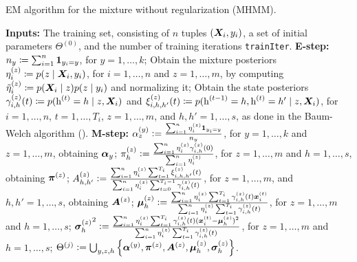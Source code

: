\begin{algorithm}
	\caption{EM algorithm for the mixture without regularization (MHMM).}
	\label{alg:mhmm}
	\begin{algorithmic}[1]
		\State \textbf{Inputs:} The training set, consisting of $n$ tuples $({\bm{X}}_i,y_i)$, a set of initial parameters $\Theta^{(0)}$, and the number of training iterations \texttt{trainIter}.
		\vspace{0.3cm}
		\vspace{0.3cm}
		\State \textbf{E-step:}
		\vspace{0.3cm}
		\Indent
			\State $n_y \coloneqq \sum_{i=1}^n \bm{1}_{y_i=y}$, for $y=1,\dots,k$;
			\vspace{0.3cm}
			\State Obtain the mixture posteriors $\eta^{(z)}_{i} \coloneqq p(z \mid {\bm{X}}_i, y_i)$, for $i=1,\dots,n$ and $z=1,\dots,m$, by computing  $\tilde{\eta}^{(z)}_{i} \coloneqq p({\bm{X}}_i \mid z)p(z \mid y_i)$ and normalizing it;
			\vspace{0.3cm}
			\State Obtain the state posteriors $\gamma^{(z)}_{i,h}(t) \coloneqq p({\textnormal{h}}^{(t)}=h \mid z, {\bm{X}}_i)$ and $\xi^{(z)}_{i,h,h'}(t) \coloneqq p({\textnormal{h}}^{(t-1)}=h, {\textnormal{h}}^{(t)}=h' \mid z, {\bm{X}}_i)$, for $i=1,\dots,n$, $t=1,\dots,T_i$, $z=1,\dots,m$, and $h,h'=1,\dots,s$, as done in the Baum-Welch algorithm (\citet{Baum1972}).
			\vspace{0.3cm}
		\EndIndent
		\State \textbf{M-step:}
		\vspace{0.3cm}
		\Indent
			\State ${\alpha}^{(y)}_{z} := \frac{\sum_{i=1}^n \eta^{(z)}_{i} \bm{1}_{y_i=y}}{n_y}$, for $y=1,\dots,k$ and $z=1,\dots,m$, obtaining ${\bm{\alpha}}_y$;
			\vspace{0.3cm}
			\State ${\pi}^{(z)}_h := \frac{\sum_{i=1}^n \eta^{(z)}_{i} \gamma^{(z)}_{i,h}(0)}{\sum_{i=1}^n \eta^{(z)}_{i}}$, for $z=1,\dots,m$ and $h=1,\dots,s$, obtaining ${\bm{\pi}}^{(z)}$;
			\vspace{0.3cm} 
			\State ${A}^{(z)}_{h,h'} := \frac{\sum_{i=1}^n \eta^{(z)}_{i} \sum_{t=1}^{T_i} \xi^{(z)}_{i,h,h'}(t)}{\sum_{i=1}^n \eta^{(z)}_{i} \sum_{t=0}^{T_i-1} \gamma^{(z)}_{i,h}(t)}$, for $z=1,\dots,m$, and $h,h'=1,\dots,s$, obtaining ${\bm{A}}^{(z)}$;
			\vspace{0.3cm}
			\State ${\bm{\mu}}^{(z)}_h := \frac{\sum_{i=1}^n \eta^{(z)}_{i} \sum_{t=1}^{T_i} \gamma^{(z)}_{i,h}(t) {\bm{x}}_i^{(t)}} {\sum_{i=1}^n \eta^{(z)}_{i} \sum_{t=1}^{T_i} \gamma^{(z)}_{i,h}(t)}$, for $z=1,\dots,m$ and $h=1,\dots,s$;
			\vspace{0.3cm}
			\State ${{\bm{\sigma}}^{(z)}_h}^2 := \frac{\sum_{i=1}^n \eta^{(z)}_{i} \sum_{t=1}^{T_i} \gamma^{(z)}_{i,h}(t) ({\bm{x}}_i^{(t)} - {\bm{\mu}}^{(z)}_h)^2} {\sum_{i=1}^n \eta^{(z)}_{i} \sum_{t=1}^{T_i} \gamma^{(z)}_{i,h}(t)}$, for $z=1,\dots,m$ and $h=1,\dots,s$;
			\vspace{0.3cm}
			\State $\Theta^{(j)} := \bigcup_{y,z,h} \left\lbrace {\bm{\alpha}}^{(y)}, {\bm{\pi}}^{(z)}, {\bm{A}}^{(z)}, {\bm{\mu}}^{(z)}_h, {\bm{\sigma}}^{(z)}_h \right\rbrace$.
			\vspace{0.3cm}
		\EndIndent
		\EndFor  
	\end{algorithmic}
\end{algorithm}

